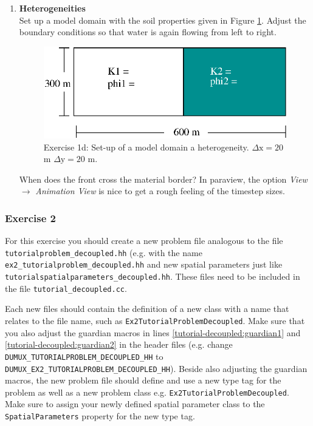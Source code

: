 \begin{enumerate}
\item \textbf{Heterogeneities}  \\
Set up a model domain with the soil properties given in Figure \ref{tutorial-deoucpled:exercise1_d}. Adjust the boundary conditions so that water is again flowing from left to right.
\begin{figure}[ht]
\centering
\includegraphics[width=0.5\linewidth,keepaspectratio]{EPS/exercise1_c.eps}
\caption{Exercise 1d: Set-up of a model domain a heterogeneity. $\Delta \text{x} = 20$ m $\Delta \text{y} = 20$ m.}\label{tutorial-deoucpled:exercise1_d}
\end{figure}
When does the front cross the material border? In paraview, the option \textit{View} $\rightarrow$ \textit{Animation View} is nice to get a rough feeling of the timestep sizes.
\end{enumerate}

\subsubsection{Exercise 2}
For this exercise you should create a new problem file analogous to
the file \texttt{tutorialproblem\_decoupled.hh} (e.g. with the name 
\texttt{ex2\_tutorialproblem\_decoupled.hh} and new spatial parameters 
just like \texttt{tutorialspatialparameters\_decoupled.hh}. These files need to
be included in the file \texttt{tutorial\_decoupled.cc}. 

Each new files should contain the definition of a new class with a 
name that relates to the file name, such as \texttt{Ex2TutorialProblemDecoupled}. 
Make sure that you also adjust the guardian
macros in lines \ref{tutorial-decoupled:guardian1} and \ref{tutorial-decoupled:guardian2}
 in the header files (e.g. change \\
\texttt{DUMUX\_TUTORIALPROBLEM\_DECOUPLED\_HH} to
\texttt{DUMUX\_EX2\_TUTORIALPROBLEM\_DECOUPLED\_HH}).  Beside also adjusting the guardian macros, 
the new problem file should define and use a new type tag for the problem as well as a new problem class
e.g. \texttt{Ex2TutorialProblemDecoupled}. Make sure to assign your newly defined spatial 
parameter class to the \texttt{SpatialParameters} property for the new 
type tag. 

